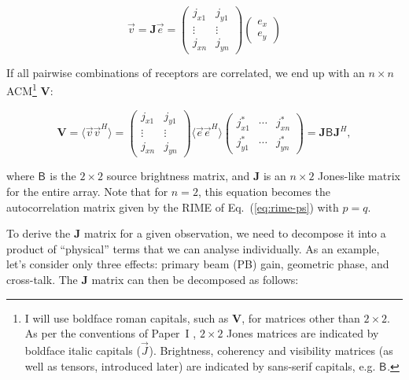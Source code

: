 \documentclass[]{aa}
\newcommand{\herm}{H}
\newcommand{\jones}[2]{\vec {#1}_{#2}}
\newcommand{\coh}[2]{\mathsf{{#1}}_{{#2}}}
\begin{document}
\[
\vec{v} = \mathbf{J}\vec e = \left(\begin{array}{cc}
j_{x1} & j_{y1}\\
\vdots & \vdots\\
j_{xn} & j_{yn}\end{array}\right)
\left(\begin{array}{c} e_x\\e_y
\end{array}\right)
\]

If all pairwise combinations of receptors are correlated, we end up with an $n\times n$ ACM\footnote{I will use boldface roman capitals, such as $\mathbf{V}$, for matrices other than $2\times2$. As per the conventions of Paper~I \citep[][Sect.~1.4]{RRIME1}, $2\times2$ Jones matrices are indicated by boldface italic capitals ($\jones{J}{}$). Brightness, coherency and visibility matrices (as well as tensors, introduced later) are indicated by sans-serif capitals, e.g. $\coh{B}{}$.} $\mathbf{V}$:

\begin{equation}\label{eq:array-response-j}
\mathbf{V} =\langle \vec v \vec v^\herm \rangle =\left(\begin{array}{cc}
j_{x1} & j_{y1}\\
\vdots & \vdots\\
j_{xn} & j_{yn}\end{array}\right) \langle \vec e \vec e^\herm \rangle \left(\begin{array}{ccc}
j^*_{x1} & \cdots & j^*_{xn}\\
j^*_{y1} & \cdots & j^*_{yn}\end{array}\right)= \mathbf{J} \coh{B}{} \mathbf{J}^\herm,
\end{equation}

where $\coh{B}{}$ is the $2\times2$ source brightness matrix, and $\mathbf{J}$ is an $n\times2$ Jones-like matrix for the entire array. Note that for $n=2$, this equation becomes the autocorrelation matrix given by the RIME of Eq.~(\ref{eq:rime-ps}) with $p=q$.

To derive the $\mathbf{J}$ matrix for a given observation, we need to decompose it into a product of ``physical'' terms that we can
analyse individually. As an example, let's consider only three effects: primary beam (PB) gain, geometric phase, and cross-talk. The 
$\mathbf{J}$ matrix can then be decomposed as follows:
\end{document}
